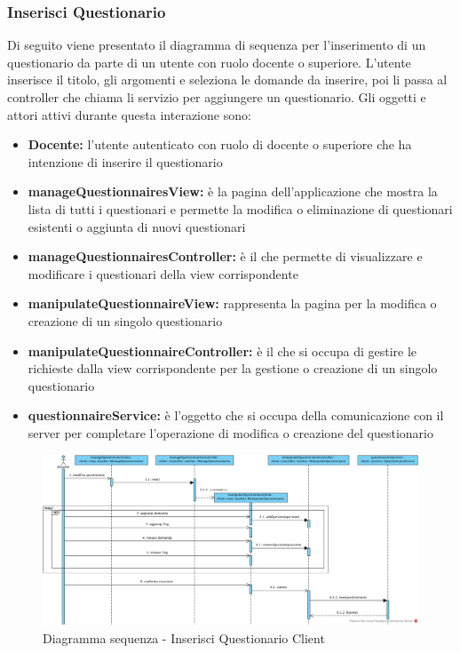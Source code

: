 \documentclass[12pt,a4paper]{article}
\begin{document}
\newpage
\subsubsection{Inserisci Questionario}
Di seguito viene presentato il diagramma di sequenza per l'inserimento di un questionario da parte di un utente con ruolo docente o superiore. L'utente inserisce il titolo, gli argomenti e seleziona le domande da inserire, poi li passa al controller che chiama li servizio per aggiungere un questionario. Gli oggetti e attori attivi durante questa interazione sono:

\begin{itemize}
	\item \textbf{Docente:}	 l'utente autenticato con ruolo di docente o superiore che ha intenzione di inserire il questionario
	\item \textbf{manageQuestionnairesView:} è la pagina dell'applicazione che mostra la lista di tutti i questionari e permette la modifica o eliminazione di questionari esistenti o aggiunta di nuovi questionari
	\item \textbf{manageQuestionnairesController:} è il  che permette di visualizzare e modificare i questionari della view corrispondente
	\item \textbf{manipulateQuestionnaireView:} rappresenta la pagina per la modifica o creazione di un singolo questionario
	\item \textbf{manipulateQuestionnaireController:} è il  che si occupa di gestire le richieste dalla view corrispondente per la gestione o creazione di un singolo questionario
	\item \textbf{questionnaireService:} è l'oggetto che si occupa della comunicazione con il server per completare l'operazione di modifica o creazione del questionario
\end{itemize}

\begin{center}
	\begin{figure}[H]
		\centering \includegraphics[max width=\myheight, angle=90]{../img/diagrammiSequenza/inserisciQuestionarioClient.png}
		\caption{Diagramma sequenza - Inserisci Questionario Client}
	\end{figure}
\end{center}
\end{document}
